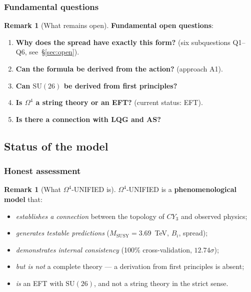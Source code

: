 \documentclass[11pt,a4paper]{article}
\newcommand{\SU}{\ensuremath{\mathrm{SU}}}
\newcommand{\CY}{\ensuremath{CY_3}}
\newcommand{\Om}{\ensuremath{\Omega^4}}
\theoremstyle{definition}
\newtheorem{remark}[theorem]{Remark}
\begin{document}
\subsubsection{Fundamental questions}

\begin{remark}[What remains open]
\label{rem:conclusions-fundamental}
\textbf{Fundamental open questions}:
\begin{enumerate}
    \item \textbf{Why does the spread have exactly this form?}
          (six subquestions Q1--Q6, see~\S\ref{sec:open}).
    \item \textbf{Can the formula be derived from the action?}
          (approach A1).
    \item \textbf{Can $\SU(26)$ be derived from first
          principles?}
    \item \textbf{Is $\Om$ a string theory
          or an EFT?} (current status: EFT).
    \item \textbf{Is there a connection with LQG and AS?}
\end{enumerate}
\end{remark}

\subsection{Status of the model}
\label{subsec:conclusions-status}

\subsubsection{Honest assessment}

\begin{remark}[What $\Om$-UNIFIED is]
\label{rem:conclusions-what-is}
$\Om$-UNIFIED is a \textbf{phenomenological model} that:
\begin{itemize}
    \item \emph{establishes a connection} between the topology of $\CY$
          and observed physics;
    \item \emph{generates testable predictions}
          ($M_{\text{SUSY}} = 3.69$~TeV, $B_i$, spread);
    \item \emph{demonstrates internal consistency}
          (100\% cross-validation, $12.74\sigma$);
    \item \emph{but is not} a complete theory ---
          a derivation from first principles is absent;
    \item \emph{is} an EFT with $\SU(26)$, and not a string
          theory in the strict sense.
\end{itemize}
\end{remark}
\end{document}
